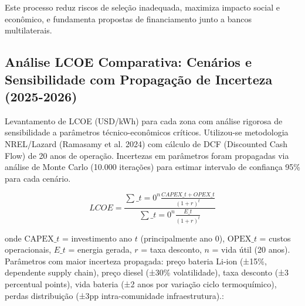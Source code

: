 \documentclass[12pt, a4paper]{article}
\begin{document}
Este processo reduz riscos de seleção inadequada, maximiza impacto social e econômico, e fundamenta propostas de financiamento junto a bancos multilaterais.



\subsection{Análise LCOE Comparativa: Cenários e Sensibilidade com Propagação de Incerteza (2025-2026)}

Levantamento de LCOE (USD/kWh) para cada zona com análise rigorosa de sensibilidade a parâmetros técnico-econômicos críticos. Utilizou-se metodologia NREL/Lazard (Ramasamy et al. 2024) com cálculo de DCF (Discounted Cash Flow) de 20 anos de operação. Incertezas em parâmetros foram propagadas via análise de Monte Carlo (10.000 iterações) para estimar intervalo de confiança 95\% para cada cenário.

\begin{equation}
LCOE = \frac{\sum\_{t=0}^{n} \frac{CAPEX\_t + OPEX\_t}{(1+r)^t}}{\sum\_{t=0}^{n} \frac{E\_t}{(1+r)^t}}
\end{equation}

onde $\text{CAPEX}\_t$ = investimento ano $t$ (principalmente ano 0), $\text{OPEX}\_t$ = custos operacionais, $E\_t$ = energia gerada, $r$ = taxa desconto, $n$ = vida útil (20 anos). Parâmetros com maior incerteza propagada: preço bateria Li-ion (±15\%, dependente supply chain), preço diesel (±30\% volatilidade), taxa desconto (±3 percentual points), vida bateria (±2 anos por variação ciclo termoquímico), perdas distribuição (±3pp intra-comunidade infraestrutura).:
\end{document}
